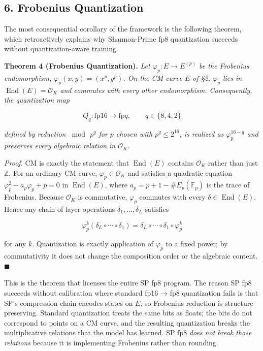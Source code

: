\documentclass[
  11pt,
]{article}
\begin{document}
\hypertarget{frobenius-quantization}{%
\subsection{6. Frobenius Quantization}\label{frobenius-quantization}}

The most consequential corollary of the framework is the following
theorem, which retroactively explains why Shannon-Prime fp8 quantization
succeeds without quantization-aware training.

\textbf{Theorem 4 (Frobenius Quantization).} \emph{Let
\(\varphi_p : E \to E^{(p)}\) be the Frobenius endomorphism,
\(\varphi_p(x, y) = (x^p, y^p)\). On the CM curve \(E\) of §2,
\(\varphi_p\) lies in \(\operatorname{End}(E) = \mathcal{O}_K\) and
commutes with every other endomorphism. Consequently, the quantization
map}

\[Q_q : \text{fp}16 \longrightarrow \text{fp}q, \qquad q \in \{8, 4, 2\}\]

\emph{defined by reduction \(\bmod \, p^q\) for \(p\) chosen with
\(p^q \leq 2^{16}\), is realized as \(\varphi_p^{16 - q}\) and preserves
every algebraic relation in \(\mathcal{O}_K\).}

\emph{Proof.} CM is exactly the statement that \(\operatorname{End}(E)\)
contains \(\mathcal{O}_K\) rather than just \(\mathbb{Z}\). For an
ordinary CM curve, \(\varphi_p \in \mathcal{O}_K\) and satisfies a
quadratic equation \(\varphi_p^2 - a_p \varphi_p + p = 0\) in
\(\operatorname{End}(E)\), where \(a_p = p + 1 - \#E_p(\mathbb{F}_p)\)
is the trace of Frobenius. Because \(\mathcal{O}_K\) is commutative,
\(\varphi_p\) commutes with every \(\delta \in \operatorname{End}(E)\).
Hence any chain of layer operations \(\delta_1, \dots, \delta_L\)
satisfies

\[\varphi_p^k(\delta_L \circ \cdots \circ \delta_1) = \delta_L \circ \cdots \circ \delta_1 \circ \varphi_p^k\]

for any \(k\). Quantization is exactly application of \(\varphi_p\) to a
fixed power; by commutativity it does not change the composition order
or the algebraic content. \(\blacksquare\)

This is the theorem that licenses the entire SP fp8 program. The reason
SP fp8 succeeds without calibration where standard fp16 → fp8
quantization fails is that SP's compression chain encodes states on
\(E\), so Frobenius reduction is structure-preserving. Standard
quantization treats the same bits as floats; the bits do not correspond
to points on a CM curve, and the resulting quantization breaks the
multiplicative relations that the model has learned. SP fp8 \emph{does
not break those relations} because it is implementing Frobenius rather
than rounding.
\end{document}

